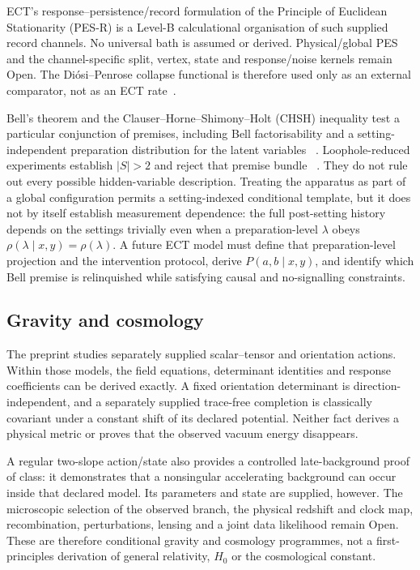 \documentclass[11pt,a4paper]{article}
\begin{document}
ECT's response--persistence/record formulation of the Principle of Euclidean
Stationarity (PES-R) is a Level-B calculational organisation of such supplied
record channels.  No universal bath is assumed or derived.  Physical/global
PES and the channel-specific split, vertex, state and response/noise kernels
remain Open.  The Di\'osi--Penrose collapse
functional is therefore used only as an external comparator, not as an ECT
rate~\cite{Diosi1987,Penrose1996}.

Bell's theorem and the Clauser--Horne--Shimony--Holt (CHSH) inequality test a
particular conjunction of premises, including Bell factorisability and a
setting-independent preparation distribution for the latent variables
~\cite{Bell1964EPR,CHSH1969}.  Loophole-reduced experiments establish
$|S|>2$ and reject that premise bundle
~\cite{Hensen2015,GiustinaEtAl2015,ShalmEtAl2015}.  They do not rule out every
possible hidden-variable description.  Treating the apparatus as part of a
global configuration permits a setting-indexed conditional template, but it
does not by itself establish measurement dependence: the full post-setting
history depends on the settings trivially even when a preparation-level
$\lambda$ obeys $\rho(\lambda\mid x,y)=\rho(\lambda)$.  A future ECT model must
define that preparation-level projection and the intervention protocol, derive
$P(a,b\mid x,y)$, and identify which Bell premise is relinquished while
satisfying causal and no-signalling constraints.

\subsection{Gravity and cosmology}

The preprint studies separately supplied scalar--tensor and orientation
actions.  Within those models, the field equations, determinant identities
and response coefficients can be derived exactly.  A fixed orientation
determinant is direction-independent, and a separately supplied trace-free
completion is classically covariant under a constant shift of its declared
potential.  Neither fact derives a physical metric or proves that the
observed vacuum energy disappears.

A regular two-slope action/state also provides a controlled late-background
proof of class: it demonstrates that a nonsingular accelerating background
can occur inside that declared model.  Its parameters and state are supplied,
however.  The microscopic selection of the observed branch, the physical
redshift and clock map, recombination, perturbations, lensing and a joint data
likelihood remain Open.  These are therefore conditional gravity and
cosmology programmes, not a first-principles derivation of general relativity,
$H_0$ or the cosmological constant.
\end{document}
